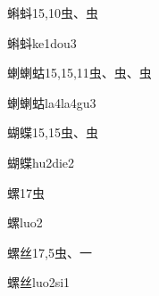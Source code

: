 \begin{entry}{蝌蚪}{15,10}{⾍、⾍}
  \begin{phonetics}{蝌蚪}{ke1dou3}
  \end{phonetics}
\end{entry}

\begin{entry}{蝲蝲蛄}{15,15,11}{⾍、⾍、⾍}
  \begin{phonetics}{蝲蝲蛄}{la4la4gu3}
  \end{phonetics}
\end{entry}

\begin{entry}{蝴蝶}{15,15}{⾍、⾍}
  \begin{phonetics}{蝴蝶}{hu2die2}
  \end{phonetics}
\end{entry}

\begin{entry}{螺}{17}{⾍}
  \begin{phonetics}{螺}{luo2}
  \end{phonetics}
\end{entry}

\begin{entry}{螺丝}{17,5}{⾍、⼀}
  \begin{phonetics}{螺丝}{luo2si1}
  \end{phonetics}
\end{entry}



